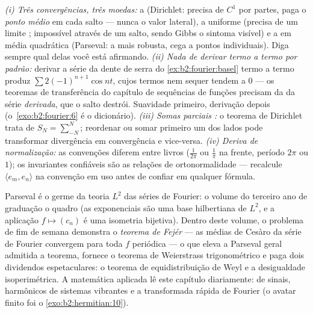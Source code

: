 \begin{remark}
\emph{(i) Três convergências, três moedas:} a 
(Dirichlet: precisa de $C^1$ por partes, paga o \emph{ponto médio} em
cada salto --- nunca o valor lateral), a uniforme (precisa de um
limite ; impossível através de um salto, sendo Gibbs o
sintoma visível) e a em média quadrática (Parseval: a mais
robusta, cega a pontos individuais). Diga sempre qual delas você
está afirmando. \emph{(ii) Nada de derivar termo a termo por
padrão:} derivar a série da dente de serra do
\cref{ex:b2:fourier:basel} termo a termo produz $\sum
2(-1)^{n+1}\cos nt$, cujos termos nem sequer tendem a $0$ ---
os teoremas de transferência do capítulo de sequências de funções precisam da
 da série \emph{derivada}, que o salto
destrói. Suavidade primeiro, derivação depois
(o~\cref{exo:b2:fourier:6} é o dicionário). \emph{(iii)
Somas parciais :} o teorema de Dirichlet trata de $S_N =
\sum_{-N}^{N}$; reordenar ou somar primeiro um dos lados pode
transformar divergência em convergência e vice-versa. \emph{(iv)
Deriva de normalização:} as convenções diferem entre livros
($\frac{1}{2\pi}$ ou $\frac1\pi$ na frente, período $2\pi$ ou
$1$); os invariantes confiáveis são as relações de ortonormalidade
--- recalcule $\langle e_m, e_n\rangle$ na convenção em
uso antes de confiar em qualquer fórmula.
\end{remark}

\begin{remark}
Parseval é o germe da teoria $L^2$ das séries de Fourier: o
volume do terceiro ano de graduação  o quadro (as exponenciais são uma
base hilbertiana de $L^2$, e a aplicação $f \mapsto (c_n)$ é uma
isometria bijetiva). Dentro deste volume, o problema de fim de semana
demonstra o \emph{teorema de Fejér} --- as médias de Cesàro da
série de Fourier convergem  para toda $f$ periódica
 --- o que eleva a Parseval geral admitida a
teorema, fornece o teorema de Weierstrass trigonométrico e paga
dois dividendos espetaculares: o teorema de equidistribuição de Weyl e
a desigualdade isoperimétrica. A matemática aplicada lê este
capítulo diariamente:  de sinais, harmônicos de sistemas
vibrantes e a transformada rápida de Fourier (o avatar finito foi o
\cref{exo:b2:hermitian:10}).
\end{remark}

